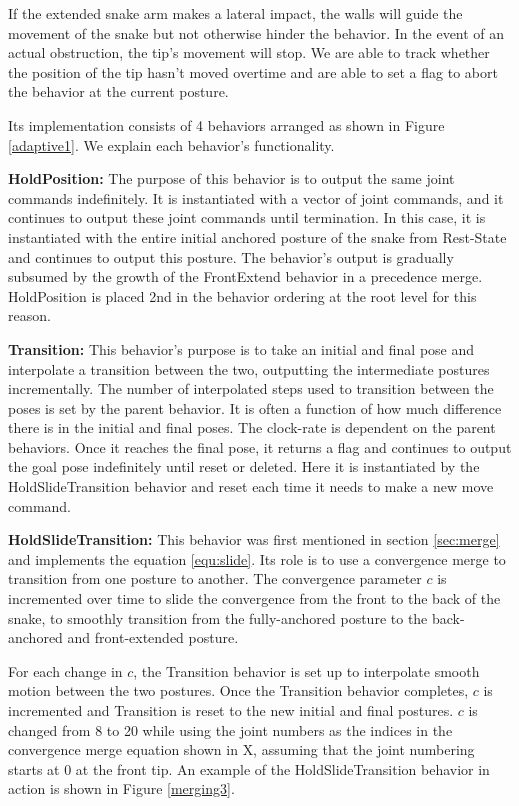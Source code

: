 If the extended snake arm makes a lateral impact, the walls will guide the movement of the snake but not otherwise hinder the behavior.  In the event of an actual obstruction, the tip’s movement will stop.  We are able to track whether the position of the tip hasn’t moved overtime and are able to set a flag to abort the behavior at the current posture.

Its implementation consists of 4 behaviors arranged as shown in Figure \ref{adaptive1}.  We explain each behavior's functionality.

\textbf{HoldPosition:} The purpose of this behavior is to output the same joint commands indefinitely.  It is instantiated with a vector of joint commands, and it continues to output these joint commands until termination.  In this case, it is instantiated with the entire initial anchored posture of the snake from Rest-State and continues to output this posture.  The behavior’s output is gradually subsumed by the growth of the FrontExtend behavior in a precedence merge.  HoldPosition is placed 2nd in the behavior ordering at the root level for this reason.

\textbf{Transition:} This behavior’s purpose is to take an initial and final pose and interpolate a transition between the two, outputting the intermediate postures incrementally.  The number of interpolated steps used to transition between the poses is set by the parent behavior.  It is often a function of how much difference there is in the initial and final poses.  The clock-rate is dependent on the parent behaviors. Once it reaches the final pose, it returns a flag and continues to output the goal pose indefinitely until reset or deleted.  Here it is instantiated by the HoldSlideTransition behavior and reset each time it needs to make a new move command.

\textbf{HoldSlideTransition:} This behavior was first mentioned in section \ref{sec:merge} and implements the equation \ref{equ:slide}.  Its role is to use a convergence merge to transition from one posture to another.  The convergence parameter $c$ is incremented over time to slide the convergence from the front to the back of the snake, to smoothly transition from the fully-anchored posture to the back-anchored and front-extended posture.

For each change in $c$, the Transition behavior is set up to interpolate smooth motion between the two postures.  Once the Transition behavior completes, $c$ is incremented and Transition is reset to the new initial and final postures.  $c$ is changed from 8 to 20 while using the joint numbers as the indices in the convergence merge equation shown in X, assuming that the joint numbering starts at 0 at the front tip.  An example of the HoldSlideTransition behavior in action is shown in Figure \ref{merging3}.

